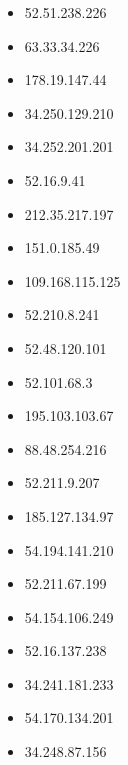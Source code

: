 \documentclass{article}
\begin{document}
\begin{itemize}
    
        \item 52.51.238.226
    
        \item 63.33.34.226
    
        \item 178.19.147.44
    
        \item 34.250.129.210
    
        \item 34.252.201.201
    
        \item 52.16.9.41
    
        \item 212.35.217.197
    
        \item 151.0.185.49
    
        \item 109.168.115.125
    
        \item 52.210.8.241
    
        \item 52.48.120.101
    
        \item 52.101.68.3
    
        \item 195.103.103.67
    
        \item 88.48.254.216
    
        \item 52.211.9.207
    
        \item 185.127.134.97
    
        \item 54.194.141.210
    
        \item 52.211.67.199
    
        \item 54.154.106.249
    
        \item 52.16.137.238
    
        \item 34.241.181.233
    
        \item 54.170.134.201
    
        \item 34.248.87.156
    

\end{itemize}
\end{document}

